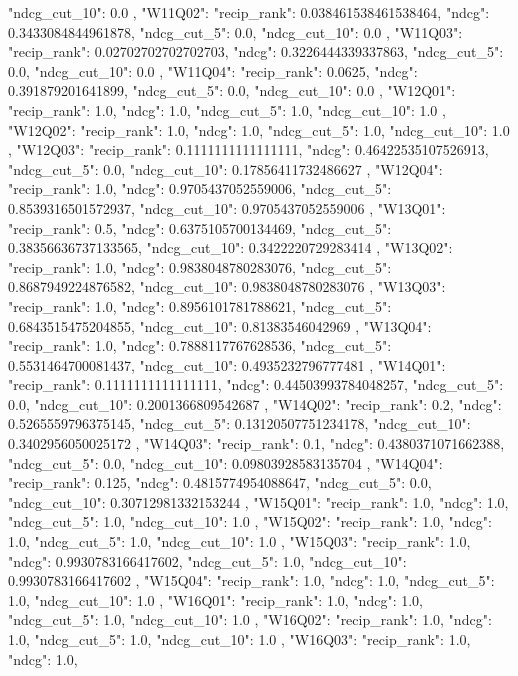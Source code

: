 {{  "ndcg_cut_10": 0.0
 },
 "W11Q02": {
  "recip_rank": 0.038461538461538464,
  "ndcg": 0.3433084844961878,
  "ndcg_cut_5": 0.0,
  "ndcg_cut_10": 0.0
 },
 "W11Q03": {
  "recip_rank": 0.02702702702702703,
  "ndcg": 0.3226444339337863,
  "ndcg_cut_5": 0.0,
  "ndcg_cut_10": 0.0
 },
 "W11Q04": {
  "recip_rank": 0.0625,
  "ndcg": 0.391879201641899,
  "ndcg_cut_5": 0.0,
  "ndcg_cut_10": 0.0
 },
 "W12Q01": {
  "recip_rank": 1.0,
  "ndcg": 1.0,
  "ndcg_cut_5": 1.0,
  "ndcg_cut_10": 1.0
 },
 "W12Q02": {
  "recip_rank": 1.0,
  "ndcg": 1.0,
  "ndcg_cut_5": 1.0,
  "ndcg_cut_10": 1.0
 },
 "W12Q03": {
  "recip_rank": 0.1111111111111111,
  "ndcg": 0.46422535107526913,
  "ndcg_cut_5": 0.0,
  "ndcg_cut_10": 0.17856411732486627
 },
 "W12Q04": {
  "recip_rank": 1.0,
  "ndcg": 0.9705437052559006,
  "ndcg_cut_5": 0.8539316501572937,
  "ndcg_cut_10": 0.9705437052559006
 },
 "W13Q01": {
  "recip_rank": 0.5,
  "ndcg": 0.6375105700134469,
  "ndcg_cut_5": 0.38356636737133565,
  "ndcg_cut_10": 0.3422220729283414
 },
 "W13Q02": {
  "recip_rank": 1.0,
  "ndcg": 0.9838048780283076,
  "ndcg_cut_5": 0.8687949224876582,
  "ndcg_cut_10": 0.9838048780283076
 },
 "W13Q03": {
  "recip_rank": 1.0,
  "ndcg": 0.8956101781788621,
  "ndcg_cut_5": 0.6843515475204855,
  "ndcg_cut_10": 0.81383546042969
 },
 "W13Q04": {
  "recip_rank": 1.0,
  "ndcg": 0.7888117767628536,
  "ndcg_cut_5": 0.5531464700081437,
  "ndcg_cut_10": 0.4935232796777481
 },
 "W14Q01": {
  "recip_rank": 0.1111111111111111,
  "ndcg": 0.44503993784048257,
  "ndcg_cut_5": 0.0,
  "ndcg_cut_10": 0.2001366809542687
 },
 "W14Q02": {
  "recip_rank": 0.2,
  "ndcg": 0.5265559796375145,
  "ndcg_cut_5": 0.13120507751234178,
  "ndcg_cut_10": 0.3402956050025172
 },
 "W14Q03": {
  "recip_rank": 0.1,
  "ndcg": 0.4380371071662388,
  "ndcg_cut_5": 0.0,
  "ndcg_cut_10": 0.09803928583135704
 },
 "W14Q04": {
  "recip_rank": 0.125,
  "ndcg": 0.4815774954088647,
  "ndcg_cut_5": 0.0,
  "ndcg_cut_10": 0.30712981332153244
 },
 "W15Q01": {
  "recip_rank": 1.0,
  "ndcg": 1.0,
  "ndcg_cut_5": 1.0,
  "ndcg_cut_10": 1.0
 },
 "W15Q02": {
  "recip_rank": 1.0,
  "ndcg": 1.0,
  "ndcg_cut_5": 1.0,
  "ndcg_cut_10": 1.0
 },
 "W15Q03": {
  "recip_rank": 1.0,
  "ndcg": 0.9930783166417602,
  "ndcg_cut_5": 1.0,
  "ndcg_cut_10": 0.9930783166417602
 },
 "W15Q04": {
  "recip_rank": 1.0,
  "ndcg": 1.0,
  "ndcg_cut_5": 1.0,
  "ndcg_cut_10": 1.0
 },
 "W16Q01": {
  "recip_rank": 1.0,
  "ndcg": 1.0,
  "ndcg_cut_5": 1.0,
  "ndcg_cut_10": 1.0
 },
 "W16Q02": {
  "recip_rank": 1.0,
  "ndcg": 1.0,
  "ndcg_cut_5": 1.0,
  "ndcg_cut_10": 1.0
 },
 "W16Q03": {
  "recip_rank": 1.0,
  "ndcg": 1.0,
}}
